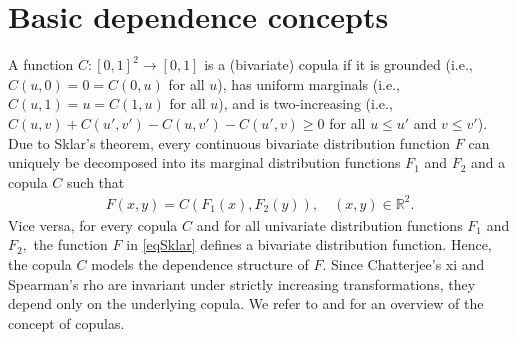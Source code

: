 \documentclass{article}
\theoremstyle{plain}
\theoremstyle{definition}
\begin{document}
\section{Basic dependence concepts}\label{sec2}

A function \(C\colon [0,1]^2 \to [0,1]\) is a (bivariate) copula if it is grounded (i.e., \(C(u,0) = 0 = C(0,u)\) for all \(u\)), has uniform marginals (i.e., \(C(u,1)=u=C(1,u)\) for all \(u\)), and is two-increasing (i.e., \(C(u,v)+C(u',v')-C(u,v')-C(u',v)\geq 0\) for all \(u\le u'\) and \(v\le v'\)). Due to Sklar's theorem, every continuous bivariate distribution function \(F\) can uniquely be decomposed into its marginal distribution functions \(F_1\) and \(F_2\) and a copula \(C\) such that
\begin{align}\label{eqSklar}
    F(x,y) = C(F_1(x),F_2(y)), \quad (x,y)\in {\mathbb{R}}^2.
\end{align}
Vice versa, for every copula \(C\) and for all univariate distribution functions \(F_1\) and \(F_2,\) the function \(F\) in \eqref{eqSklar} defines a bivariate distribution function. Hence, the copula \(C\) models the dependence structure of \(F.\) Since Chatterjee's xi and Spearman's rho are invariant under strictly increasing transformations, they depend only on the underlying copula. We refer to \cite{Durante-2016} and \cite{Nelsen-2006} for an overview of the concept of copulas.

\end{document}
